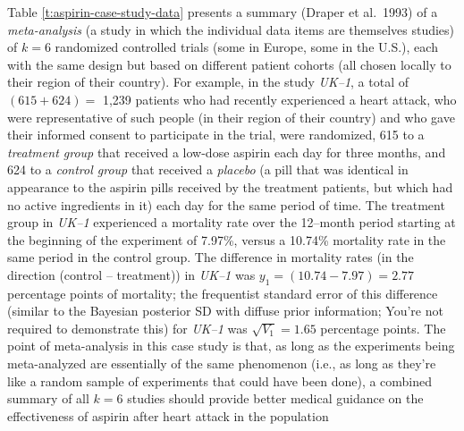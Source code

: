 \documentclass[12pt]{article}
\begin{document}
Table \ref{t:aspirin-case-study-data} presents a summary (Draper et al.~1993) of a \textit{meta-analysis} (a study in which the individual data items are themselves studies) of $k = 6$ randomized controlled trials (some in Europe, some in the U.S.), each with the same design but based on different patient cohorts (all chosen locally to their region of their country). For example, in the study \textit{UK--1}, a total of $( 615 + 624 ) =$ 1,239 patients who had recently experienced a heart attack, who were representative of such people (in their region of their country) and who gave their informed consent to participate in the trial, were randomized, 615 to a \textit{treatment group} that received a low-dose aspirin each day for three months, and 624 to a \textit{control group} that received a \textit{placebo} (a pill that was identical in appearance to the aspirin pills received by the treatment patients, but which had no active ingredients in it) each day for the same period of time. The treatment group in \textit{UK--1} experienced a mortality rate over the 12--month period starting at the beginning of the experiment of 7.97\%, versus a 10.74\% mortality rate in the same period in the control group. The difference in mortality rates (in the direction (control -- treatment)) in \textit{UK--1} was $y_1 = ( 10.74 - 7.97 ) = 2.77$ percentage points of mortality; the frequentist standard error of this difference (similar to the Bayesian posterior SD with diffuse prior information; You're not required to demonstrate this) for \textit{UK--1} was $\sqrt{ V_1 } = 1.65$ percentage points. The point of meta-analysis in this case study is that, as long as the experiments being meta-analyzed are essentially of the same phenomenon (i.e., as long as they're like a random sample of experiments that could have been done), a combined summary of all $k = 6$ studies should provide better medical guidance on the effectiveness of aspirin after heart attack in the population
\end{document}
